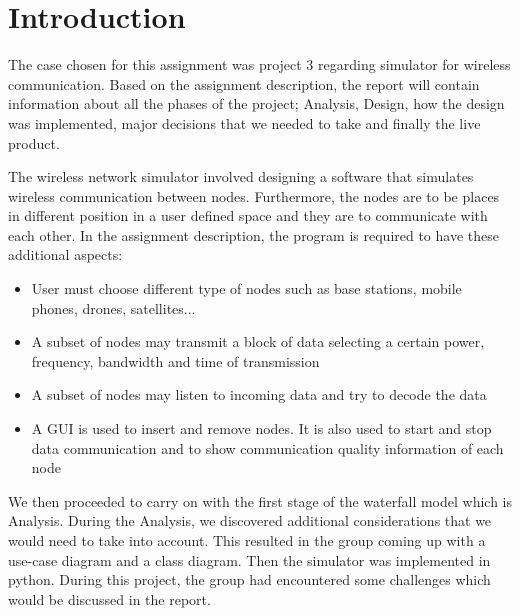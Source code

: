 \chapter{Introduction}\label{ch:introduction}

The case chosen for this assignment was project 3 regarding simulator for wireless communication. Based on the assignment description, the report will contain information about all the phases of the project; Analysis, Design, how the design was implemented, major decisions that we needed to take and finally the live product.\newline

The wireless network simulator involved designing a software that simulates wireless communication between nodes. Furthermore, the nodes are to be places in different position in a user defined space and they are to communicate with each other. In the assignment description, the program is required to have these additional aspects:
\begin{itemize}
    \item User must choose different type of nodes such as base stations, mobile phones, drones, satellites...
    \item A subset of nodes may transmit a block of data selecting a certain power, frequency, bandwidth and time of transmission
    \item A subset of nodes may listen to incoming data and try to decode the data
    \item A GUI is used to insert and remove nodes. It is also used to start and stop data communication and to show communication quality information of each node 
\end{itemize}

We then proceeded to carry on with the first stage of the waterfall model which is Analysis. During the Analysis, we discovered additional considerations that we would need to take into account. This resulted in the group coming up with a use-case diagram and a class diagram. Then the simulator was implemented in python. During this project, the group had encountered some challenges which would be discussed in the report.







